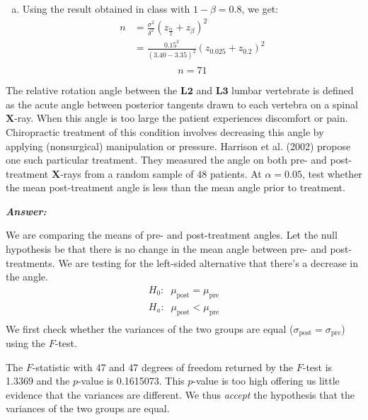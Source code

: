 \documentclass[12pt]{article}
\newenvironment{question}[2][Question]{\begin{trivlist}
\item[\hskip \labelsep {\bfseries #1}\hskip \labelsep {\bfseries #2.}]}{\end{trivlist}}
\begin{document}
\begin{enumerate}[(a)]
\item Using the result obtained in class with $1 - \beta = 0.8$, we get:
\begin{align*}
n &= \frac{\sigma^2}{\delta^2} (z_{\frac{\alpha}{2}}+ z_{\beta})^2 \\
&= \frac{0.15^2}{(3.40 - 3.35)^2 }(z_{0.025} + z_{0.2})^2 \\
\end{align*}
$$
\boxed{n = 71}
$$

\end{enumerate}
\bigskip
\bigskip
 \begin{question}{7.2}  The relative rotation angle between the $\mathbf{L2}$ and $\mathbf{L3}$  lumbar vertebrate is defined as the acute
angle between posterior tangents drawn to each vertebra on a spinal $\mathbf{X}$-ray. When this angle is too
large the patient experiences discomfort or pain. Chiropractic treatment of this condition involves
decreasing this angle by applying (nonsurgical) manipulation or pressure. Harrison et al. (2002)
propose one such particular treatment. They measured the angle on both pre- and post-treatment
$\mathbf{X}$-rays from a random sample of 48 patients. At $\alpha = 0.05$, test whether the mean post-treatment
angle is less than the mean angle prior to treatment.

%
%
%
\end{question} 

  \textbf{\color{TealBlue}\emph{Answer:} } 

\bigskip
We are comparing the means of pre- and post-treatment angles. 
Let the null hypothesis be that there is no change in the mean angle between pre- and post-treatments. We are testing for the left-sided alternative that there's  a decrease in the angle.  
\begin{align*}
H_0 : \; \; \mu_{\text{post}} = \mu_{\text{pre}}  \\
H_a:  \; \; \mu_{\text{post}} < \mu_{\text{pre}}  \\
\end{align*}
We first check whether the variances of the two groups are equal ($\sigma_{\text{post}} = \sigma_{\text{pre}} $) using the $F$-test. 

The $F$-statistic with 47 and 47 degrees of freedom returned by the $F$-test is 1.3369 and the $p$-value is 0.1615073. This $p$-value is too high offering us little evidence that the variances are different.  We thus \emph{accept} the hypothesis that the variances of the two groups are equal.
\end{document}
